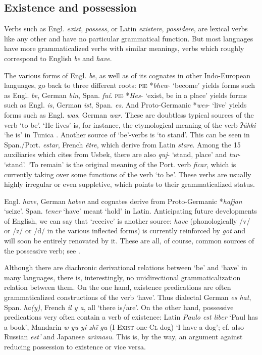 \subsection{Existence and possession}

Verbs such as Engl. \textit{exist}, \textit{possess}, or Latin \textit{existere}, \textit{possidere}, are lexical verbs like any other and have no particular grammatical function. But most languages have more grammaticalized verbs with similar meanings, verbs which roughly correspond to English \textit{be} and \textit{have}.

The various forms of Engl. \textit{be}, as well as of its cognates in other Indo-European languages, go back to three different roots: \textsc{pie} *\textit{bhew}{}- ‘become’ yields forms such as Engl. \textit{be}, German \textit{bin}, Span. \textit{fuí}. \textsc{pie} *\textit{Hes}{}- ‘exist, be in a place’ yields forms such as Engl. \textit{is}, German \textit{ist}, Span. \textit{es}. And Proto-Germanic *\textit{wes}{}- ‘live’ yields forms such as Engl. \textit{was}, German \textit{war}. These are doubtless typical sources of the verb ‘to be’. ‘He lives’ is, for instance, the etymological meaning of the verb \textit{ʔúhki} ‘he is’ in Tunica \citep[41ff]{Haas1941}. Another source of ‘be’-verbs is ‘to stand’. This can be seen in Span./Port. \textit{estar}, French \textit{être}, which derive from Latin \textit{stare}. Among the 15 auxiliaries which \citet[85f]{Žirmunskij1966} cites from Usbek, there are also \textit{quj}{}- ‘stand, place’ and \textit{tur}{}- ‘stand’. ‘To remain’ is the original meaning of the Port. verb \textit{ficar}, which is currently taking over some functions of the verb ‘to be’. These verbs are usually highly irregular or even suppletive, which points to their grammaticalized status.

Engl. \textit{have}, German \textit{haben} and cognates derive from Proto-Germanic *\textit{hafjan} ‘seize’. Span. \textit{tener} ‘have’ meant ‘hold’ in Latin. Anticipating future developments of English, we can say that ‘receive’ is another source: \textit{have} (phonologically /v/ or /z/ or /d/ in the various inflected forms) is currently reinforced by \textit{got} and will soon be entirely renovated by it. These are all, of course, common sources of the possessive verb; see \citet[104-106]{Seiler1983}.

Although there are diachronic derivational relations between ‘be’ and ‘have’ in many languages, there is, interestingly, no unidirectional grammaticalization relation between them. On the one hand, existence predications are often grammaticalized constructions of the verb ‘have’. Thus dialectal German \textit{es hat}, Span. \textit{ha(y)}, French \textit{il y a}, all ‘there is/are’. On the other hand, possessive predications very often contain a verb of existence: Latin \textit{Paulo est liber} ‘Paul has a book’, Mandarin \textit{w yu yí-zh\=i gu }(I \textsc{Exist} one-\textsc{Cl} dog) ‘I have a dog’; cf. also Russian \textit{est'} and Japanese \textit{arimasu}. This is, by the way, an argument against reducing possession to existence or vice versa.

